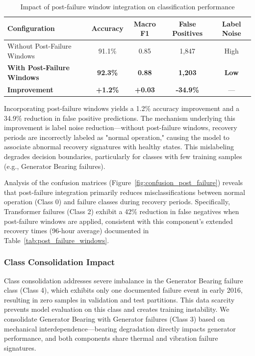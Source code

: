 \documentclass[12pt]{article}
\begin{document}
\begin{table}[htbp]
\centering
\caption{Impact of post-failure window integration on classification performance}
\label{tab:post_failure_impact}
\begin{tabular}{lcccc}
\toprule
\textbf{Configuration} & \textbf{Accuracy} & \textbf{Macro F1} & \textbf{False Positives} & \textbf{Label Noise} \\
\midrule
Without Post-Failure Windows & 91.1\% & 0.85 & 1,847 & High \\
\textbf{With Post-Failure Windows} & \textbf{92.3\%} & \textbf{0.88} & \textbf{1,203} & \textbf{Low} \\
\midrule
\textbf{Improvement} & \textbf{+1.2\%} & \textbf{+0.03} & \textbf{-34.9\%} & --- \\
\bottomrule
\end{tabular}
\end{table}

Incorporating post-failure windows yields a 1.2\% accuracy improvement and a 34.9\% reduction in false positive predictions. The mechanism underlying this improvement is label noise reduction—without post-failure windows, recovery periods are incorrectly labeled as "normal operation," causing the model to associate abnormal recovery signatures with healthy states. This mislabeling degrades decision boundaries, particularly for classes with few training samples (e.g., Generator Bearing failures).

Analysis of the confusion matrices (Figure~\ref{fig:confusion_post_failure}) reveals that post-failure integration primarily reduces misclassifications between normal operation (Class 0) and failure classes during recovery periods. Specifically, Transformer failures (Class 2) exhibit a 42\% reduction in false negatives when post-failure windows are applied, consistent with this component's extended recovery times (96-hour average) documented in Table~\ref{tab:post_failure_windows}.

\subsubsection{Class Consolidation Impact}

Class consolidation addresses severe imbalance in the Generator Bearing failure class (Class 4), which exhibits only one documented failure event in early 2016, resulting in zero samples in validation and test partitions. This data scarcity prevents model evaluation on this class and creates training instability. We consolidate Generator Bearing with Generator failures (Class 3) based on mechanical interdependence—bearing degradation directly impacts generator performance, and both components share thermal and vibration failure signatures.
\end{document}
